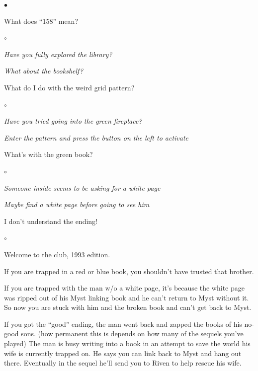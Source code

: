 \documentclass{book}
\newenvironment{list1}%
{\begin{list}{$\bullet$}{\setlength{\parsep}{0.05ex}\setlength{\itemsep}{0mm}}}
{\end{list}\normalsize}
\newenvironment{list2}%
{\begin{list}{$\circ$}{\setlength{\parsep}{0.05ex}\setlength{\itemsep}{0mm}}}
{\end{list}\normalsize}
\begin{document}
\begin{list1}
	\item What does ``158'' mean?
		\begin{list2}
		\item {\em Have you fully explored the library?}
		\item {\em What about the bookshelf?}
		\end{list2}

	\item What do I do with the weird grid pattern?
		\begin{list2}
		\item {\em Have you tried going into the green fireplace?}
		\item {\em Enter the pattern and press the button on the left
			to activate}
		\end{list2}

	\item What's with the green book?
		\begin{list2}
		\item {\em Someone inside seems to be asking for a white page}
		\item {\em Maybe find a white page before going to see him}
		\end{list2}
\pagebreak
	\item I don't understand the ending!
		\begin{list2}
		\item Welcome to the club, 1993 edition.
		\item If you are trapped in a red or blue book, you shouldn't
			have trusted that brother.
		\item If you are trapped with the man w/o a white page,
			it's because
			the white page was ripped out of his Myst linking book
			and he can't return to Myst without it.
			So now you are stuck with him and the broken book
			and can't get back to Myst.
		\item If you got the ``good'' ending, the man went back and
			zapped the books of his no-good sons.
			(how permanent this is depends on how many of the
			sequels you've played)
			The man is busy writing into a book in an 
			attempt to save the world his wife is currently
			trapped on.
			He says you can link back to Myst and hang out there.
			Eventually in the sequel he'll send you to Riven
			to help rescue his wife.
		\end{list2}
\end{list1}
\end{document}
